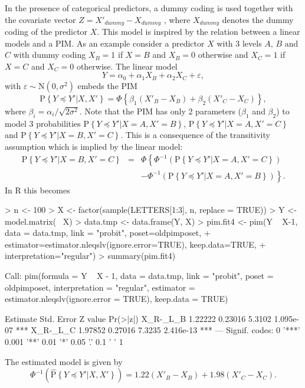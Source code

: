 \documentclass[12pt]{article}
\newcommand{\prob}[1]{\text{P}\left\{#1\right\}}
\newcommand{\hatprob}[1]{\hat{\text{P}}\left\{#1\right\}}
\newcommand{\leqs}{\preccurlyeq}
\begin{document}
In the presence of categorical predictors, a dummy coding is used together with the covariate vector $Z = X'_{dummy} - X_{dummy}$ , where $X_{dummy}$ denotes the dummy coding of the predictor $X$. This model is inspired by the relation between a linear models and a PIM. As an example consider a predictor $X$ with 3 levels $A$, $B$ and $C$ with dummy coding $X_{B} = 1$ if $X=B$ and $X_{B} = 0$ otherwise and $X_C = 1$ if $X = C$ and $X_C = 0$ otherwise. The linear model
\[
Y = \alpha_0 + \alpha_1 X_B + \alpha_2 X_C + \varepsilon,
\] 
with $\varepsilon \sim \text{N}(0,\sigma^2)$ embeds the PIM
\[
\prob{Y \leqs Y'| X, X'} = \Phi\left\{\beta_1 (X'_B - X_B) + \beta_2 (X'_C - X_C) \right\},
\]
where $\beta_i = \alpha_i/\sqrt{2 \sigma^2}$. Note that the PIM has only 2 parameters ($\beta_1$ and $\beta_2$) to model 3 probabilities $\prob{Y \leqs Y'| X = A, X' = B}$, $\prob{Y \leqs Y'| X = A, X' = C}$ and $\prob{Y \leqs Y'| X = B, X' = C}$. This is a consequence of the transitivity assumption which is implied by the linear model:
\begin{eqnarray*}
\prob{Y \leqs Y'| X = B, X' = C} &=& \Phi\left\{ \Phi^{-1} \left(\prob{Y \leqs Y'| X = A, X' = C} \right)  \right. \\
																 & & \left. 	- \Phi^{-1}\left(\prob{Y \leqs Y'| X = A, X' = B} \right) \right\}.
\end{eqnarray*}
In R this becomes
\begin{Schunk}
\begin{Sinput}
> n <- 100
> X <- factor(sample(LETTERS[1:3], n, replace = TRUE))
> Y <- model.matrix(~ X)%
> data.tmp <- data.frame(Y, X)
> pim.fit4 <- pim(Y ~ X-1, data = data.tmp, link = "probit", poset=oldpimposet, 
+   estimator=estimator.nleqslv(ignore.error=TRUE), keep.data=TRUE, 
+   interpretation="regular")
> summary(pim.fit4)
\end{Sinput}
\begin{Soutput}
Call:
pim(formula = Y ~ X - 1, data = data.tmp, link = "probit", poset = oldpimposet, 
    interpretation = "regular", estimator = estimator.nleqslv(ignore.error = TRUE), 
    keep.data = TRUE)

         Estimate Std. Error Z value  Pr(>|z|)    
X_R-_L_B  1.22222    0.23016  5.3102 1.095e-07 ***
X_R-_L_C  1.97852    0.27016  7.3235 2.416e-13 ***
---
Signif. codes:  0 '***' 0.001 '**' 0.01 '*' 0.05 '.' 0.1 ' ' 1 
\end{Soutput}
\end{Schunk}
The estimated model is given by
\[
\Phi^{-1}\left( \hatprob{Y \leqs Y'| X, X'} \right)= 1.22 (X'_B - X_B) + 1.98 (X'_C - X_C).
\]
\end{document}
